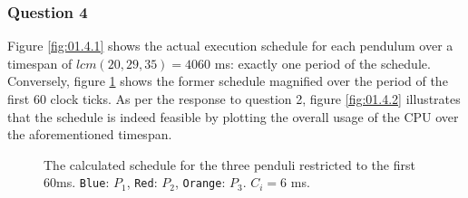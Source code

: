 \subsubsection{Question 4}

Figure \ref{fig:01.4.1} shows the actual execution schedule for each pendulum
over a timespan of $lcm(20,29,35) = 4060$ ms: exactly one period of the schedule.
Conversely, figure \ref{fig:01.4.1.small} shows the former schedule magnified
over the period of the first 60 clock ticks.
As per the response to question 2, figure \ref{fig:01.4.2} illustrates that the
schedule is indeed feasible by plotting the overall usage of the CPU over the
aforementioned timespan.

\begin{figure}[H]\centering
  \scalebox{1}{}
  \caption{The calculated schedule for the three penduli restricted to the first
    60ms. \texttt{Blue}: $P_1$, \texttt{Red}: $P_2$,
    \texttt{Orange}: $P_3$. $C_i = 6$ ms.}
  \label{fig:01.4.1.small}
\end{figure}

\noindent{}
